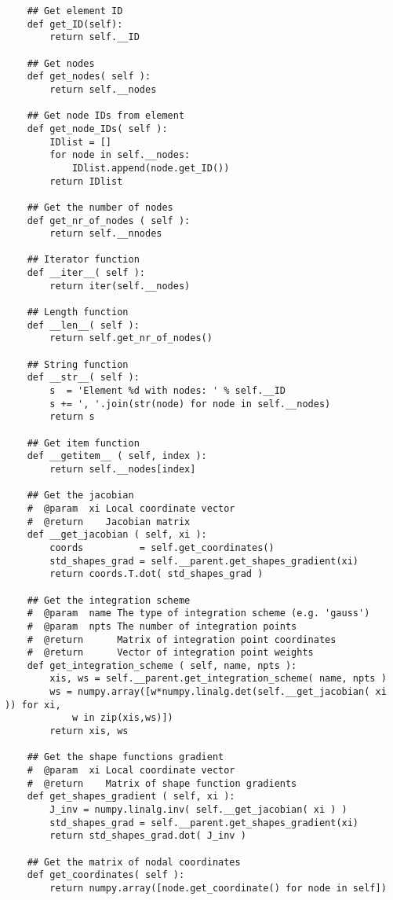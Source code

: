 \begin{appendices}
\begin{verbatim}
    ## Get element ID
    def get_ID(self):
        return self.__ID
    
    ## Get nodes
    def get_nodes( self ):
        return self.__nodes
        
    ## Get node IDs from element
    def get_node_IDs( self ):
        IDlist = []
        for node in self.__nodes:
            IDlist.append(node.get_ID())
        return IDlist     
            
    ## Get the number of nodes
    def get_nr_of_nodes ( self ):
        return self.__nnodes
        
    ## Iterator function
    def __iter__( self ):
        return iter(self.__nodes)

    ## Length function
    def __len__( self ):
        return self.get_nr_of_nodes()

    ## String function
    def __str__( self ):
        s  = 'Element %d with nodes: ' % self.__ID
        s += ', '.join(str(node) for node in self.__nodes)
        return s
        
    ## Get item function
    def __getitem__ ( self, index ):
        return self.__nodes[index]
        
    ## Get the jacobian
    #  @param  xi Local coordinate vector
    #  @return    Jacobian matrix
    def __get_jacobian ( self, xi ):
        coords          = self.get_coordinates()
        std_shapes_grad = self.__parent.get_shapes_gradient(xi)
        return coords.T.dot( std_shapes_grad )
        
    ## Get the integration scheme
    #  @param  name The type of integration scheme (e.g. 'gauss')
    #  @param  npts The number of integration points
    #  @return      Matrix of integration point coordinates
    #  @return      Vector of integration point weights
    def get_integration_scheme ( self, name, npts ):
        xis, ws = self.__parent.get_integration_scheme( name, npts )
        ws = numpy.array([w*numpy.linalg.det(self.__get_jacobian( xi )) for xi, 
			w in zip(xis,ws)])
        return xis, ws
        
    ## Get the shape functions gradient
    #  @param  xi Local coordinate vector
    #  @return    Matrix of shape function gradients
    def get_shapes_gradient ( self, xi ):
        J_inv = numpy.linalg.inv( self.__get_jacobian( xi ) )
        std_shapes_grad = self.__parent.get_shapes_gradient(xi)
        return std_shapes_grad.dot( J_inv )
        
    ## Get the matrix of nodal coordinates
    def get_coordinates( self ):
        return numpy.array([node.get_coordinate() for node in self])
        

\end{verbatim}
\end{appendices}
